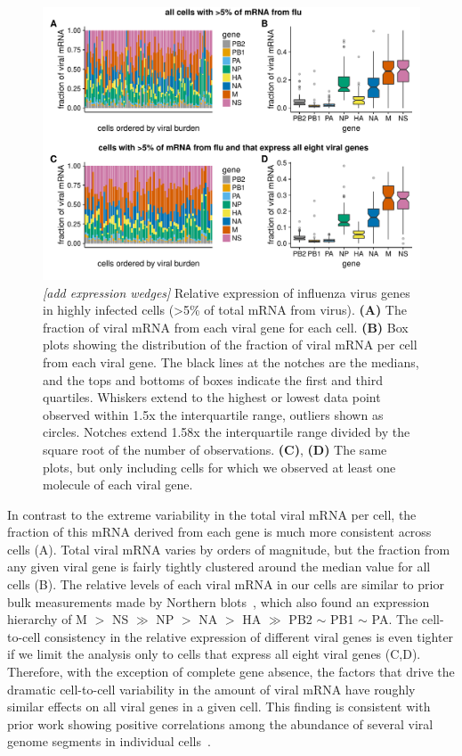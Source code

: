 \documentclass[9pt,lineno]{elife}
\newcommand{\jdbcomment}[1]{\emph{\color{red} [#1]}}
\begin{document}
\begin{figure}
\centerline{\includegraphics[width=0.9\linewidth]{figures/p_flu_expr.pdf}}
\caption{\label{fig:fluexpr}
\jdbcomment{add expression wedges}
Relative expression of influenza virus genes in highly infected cells (>5\% of total mRNA from virus).
{\bf (A)} 
The fraction of viral mRNA from each viral gene for each cell. 
{\bf (B)}
Box plots showing the distribution of the fraction of viral mRNA per cell from each viral gene.
The black lines at the notches are the medians, and the tops and bottoms of boxes indicate the first and third quartiles.
Whiskers extend to the highest or lowest data point observed within 1.5x the interquartile range, outliers shown as circles.
Notches extend 1.58x the interquartile range divided by the square root of the number of observations. 
{\bf (C)}, {\bf (D)} 
The same plots, but only including cells for which we observed at least one molecule of each viral gene.
}
\end{figure}

In contrast to the extreme variability in the total viral mRNA per cell, the fraction of this mRNA derived from each gene is much more consistent across cells (A).
Total viral mRNA varies by orders of magnitude, but the fraction from any given viral gene is fairly tightly clustered around the median value for all cells (B).
The relative levels of each viral mRNA in our cells are similar to prior bulk measurements made by Northern blots~\citep{hatada1989control}, which also found an expression hierarchy of M $>$ NS $\gg$ NP $>$ NA $>$ HA $\gg$ PB2 $\sim$ PB1 $\sim$ PA.
The cell-to-cell consistency in the relative expression of different viral genes is even tighter if we limit the analysis only to cells that express all eight viral genes (C,D).
Therefore, with the exception of complete gene absence, the factors that drive the dramatic cell-to-cell variability in the amount of viral mRNA have roughly similar effects on all viral genes in a given cell.
This finding is consistent with prior work showing positive correlations among the abundance of several viral genome segments in individual cells~\citep{Heldt:2015iz}.
\end{document}
